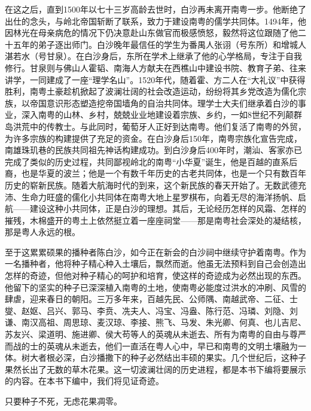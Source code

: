 在这之后，直到1500年以七十三岁高龄去世时，白沙再未离开南粤一步。他断绝了出仕的念头，与岭北帝国斩断了联系，致力于建设南粤的儒学共同体。1494年，他因林光在母亲病危的情况下仍决意赴山东做官而极感愤怒，毅然将这位跟随了他二十五年的弟子逐出师门。白沙晚年最信任的学生为番禺人张诩（号东所）和增城人湛若水（号甘泉）。在白沙身后，东所在学术上继承了他的心学格局，专注于自我修行。甘泉则与佛山人霍韬、南海人方献夫在西樵山中建设书院、教育子弟、往来讲学，一同建成了一座“理学名山”。1520年代，随着霍、方二人在“大礼议”中获得胜利，南粤土豪趁机掀起了波澜壮阔的社会改造运动，纷纷将其乡党改造为儒化宗族，以帝国意识形态塑造挖帝国墙角的自治共同体。理学士大夫们继承着白沙的事业，深入南粤的山林、乡村，兢兢业业地建设着宗族、乡约，一如8世纪不列颠群岛洪荒中的传教士。与此同时，葡萄牙人正好到达南粤。他们复活了南粤的外贸，为许多宗族的构建提供了充足的资金。在白沙身后150年，南粤宗族化宣告完成，南雄珠玑巷的民族共同祖先神话构建成功。到白沙身后400年时，潮汕、客家亦已完成了类似的历史过程，共同鄙视岭北的南粤“小华夏”诞生，他是百越的直系后裔，也是华夏的波兰；他是一个有数千年历史的古老共同体，也是一个只有数百年历史的崭新民族。随着大航海时代的到来，这个新民族的春天开始了。无数武德充沛、生命力旺盛的儒化小共同体在南粤大地上星罗棋布，向着无尽的海洋扬帆、启航——建设这种小共同体，正是白沙的理想。其后，无论经历怎样的风霜、怎样的摧残，木棉盛开的粤土上依然挺立着一座座祠堂——那是南粤社会深处的凝结核，那是粤人永远的根。

至于这累累硕果的播种者陈白沙，如今正在新会的白沙祠中继续守护着南粤。作为一名播种者，他将种子精心种入土壤后，飘然而逝。他虽无法预料到自己会创造出怎样的奇迹，但他对种子精心的呵护和培育，使这样的奇迹成为必然出现的东西。他留下的坚实的种子已深深植入南粤的土地，使南粤必能度过洪水的冲刷、风雪的肆虐，迎来春日的朝阳。三万多年来，百越先民、公师隅、南越武帝、二征、士燮、赵妪、吕兴、郭马、李贲、冼夫人、冯宝、冯盎、陈行范、冯璘、刘隐、刘谦、南汉高祖、周思琼、麦汉琼、李接、熊飞、马发、朱光卿、何真、也儿吉尼、苏友兴、梁道明、施进卿、侯大苟等人的英魂从未逝去、所有为南粤的自由与尊严而战的士的英魂从未逝去，他们一直活在粤人心中，早已和南粤的文明土壤融为一体。树大者根必深，白沙播撒下的种子必然结出丰硕的果实。几个世纪后，这种子果然长出了无数的草木花果。这一切波澜壮阔的历史进程，都是本书下编将要展示的内容。在本书下编中，我们将见证奇迹。

只要种子不死，无虑花果凋零。








